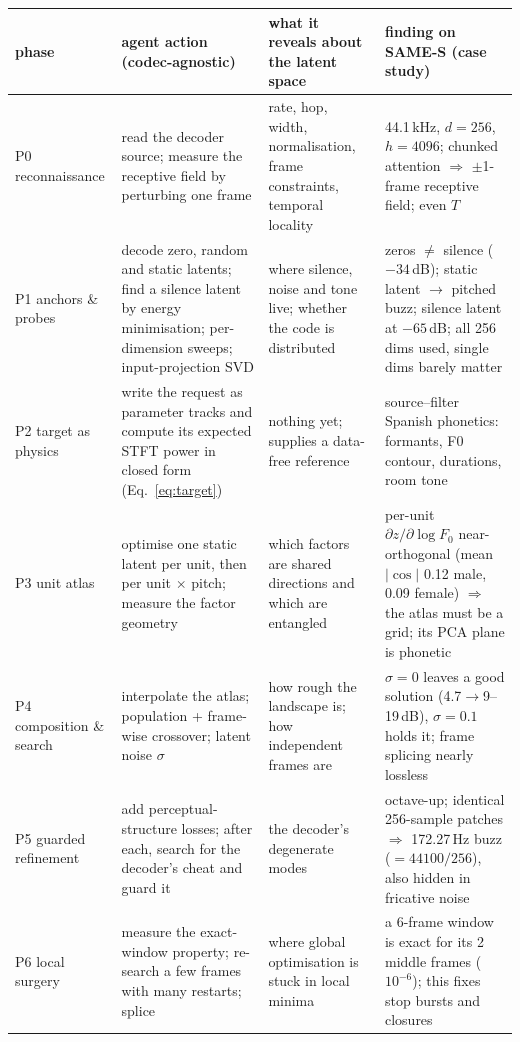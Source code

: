 \documentclass[10pt,twocolumn]{article}
\begin{document}
\begin{table}[t]
\centering\footnotesize
\setlength{\tabcolsep}{3.5pt}
\begin{tabularx}{\textwidth}{@{}>{\raggedright\arraybackslash}p{2.1cm}YYY@{}}
\toprule
phase & agent action (codec-agnostic) & what it reveals about the latent space & finding on SAME-S (case study) \\
\midrule
P0 reconnaissance & read the decoder source; measure the receptive field by perturbing one frame & rate, hop, width, normalisation, frame constraints, temporal locality & 44.1\,kHz, $d{=}256$, $h{=}4096$; chunked attention $\Rightarrow$ $\pm$1-frame receptive field; even $T$ \\
P1 anchors \& probes & decode zero, random and static latents; find a silence latent by energy minimisation; per-dimension sweeps; input-projection SVD & where silence, noise and tone live; whether the code is distributed & zeros $\neq$ silence ($-34$\,dB); static latent $\to$ pitched buzz; silence latent at $-65$\,dB; all 256 dims used, single dims barely matter \\
P2 target as physics & write the request as parameter tracks and compute its expected STFT power in closed form (Eq.~\ref{eq:target}) & nothing yet; supplies a data-free reference & source--filter Spanish phonetics: formants, F0 contour, durations, room tone \\
P3 unit atlas & optimise one static latent per unit, then per unit $\times$ pitch; measure the factor geometry & which factors are shared directions and which are entangled & per-unit $\partial z/\partial\log F_0$ near-orthogonal (mean $|\cos|$ 0.12 male, 0.09 female) $\Rightarrow$ the atlas must be a grid; its PCA plane is phonetic \\
P4 composition \& search & interpolate the atlas; population + frame-wise crossover; latent noise $\sigma$ & how rough the landscape is; how independent frames are & $\sigma{=}0$ leaves a good solution (4.7$\to$9--19\,dB), $\sigma{=}0.1$ holds it; frame splicing nearly lossless \\
P5 guarded refinement & add perceptual-structure losses; after each, search for the decoder's cheat and guard it & the decoder's degenerate modes & octave-up; identical 256-sample patches $\Rightarrow$ 172.27\,Hz buzz ($=44100/256$), also hidden in fricative noise \\
P6 local surgery & measure the exact-window property; re-search a few frames with many restarts; splice & where global optimisation is stuck in local minima & a 6-frame window is exact for its 2 middle frames ($10^{-6}$); this fixes stop bursts and closures \\

\end{tabularx}
\end{table}
\end{document}
